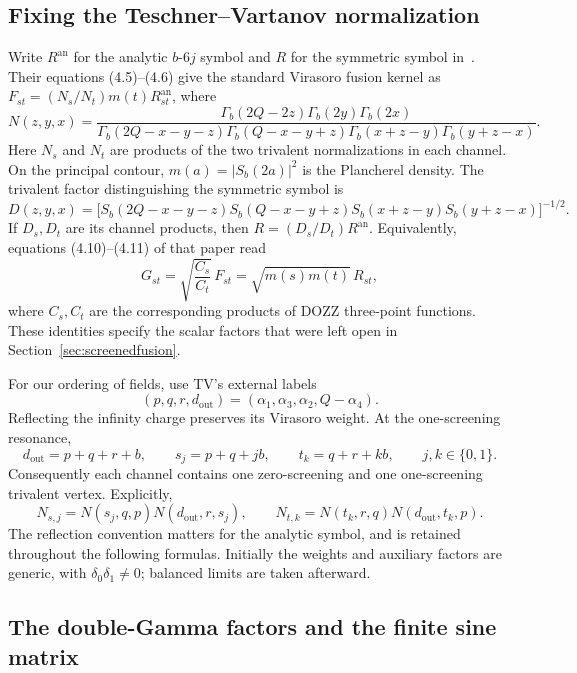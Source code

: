 \documentclass[11pt,a4paper]{article}
\numberwithin{equation}{section}
\theoremstyle{definition}
\theoremstyle{remark}
\begin{document}
\subsection{Fixing the Teschner--Vartanov normalization}

Write $R^{\mathrm{an}}$ for the analytic $b$-$6j$ symbol and
$R$ for the symmetric symbol in~\cite{TeschnerVartanov}.
Their equations (4.5)--(4.6) give the standard Virasoro fusion
kernel as $F_{st}=(N_s/N_t)m(t)R^{\mathrm{an}}_{st}$, where
\begin{equation}
 N(z,y,x)=
 \frac{\Gamma_b(2Q-2z)\Gamma_b(2y)\Gamma_b(2x)}
 {\Gamma_b(2Q-x-y-z)\Gamma_b(Q-x-y+z)
  \Gamma_b(x+z-y)\Gamma_b(y+z-x)}.
 \label{eq:TVnormalization}
\end{equation}
Here $N_s$ and $N_t$ are products of the two trivalent
normalizations in each channel. On the principal contour,
$m(a)=|S_b(2a)|^2$ is the Plancherel density. The trivalent
factor distinguishing the symmetric symbol is
\[
 D(z,y,x)=
 \bigl[S_b(2Q-x-y-z)S_b(Q-x-y+z)
 S_b(x+z-y)S_b(y+z-x)\bigr]^{-1/2}.
\]
If $D_s,D_t$ are its channel products, then
$R=(D_s/D_t)R^{\mathrm{an}}$. Equivalently, equations
(4.10)--(4.11) of that paper read
\begin{equation}
 G_{st}=\sqrt{\frac{C_s}{C_t}}\,F_{st}
       =\sqrt{m(s)m(t)}\,R_{st},
 \label{eq:TVunitarykernel}
\end{equation}
where $C_s,C_t$ are the corresponding products of DOZZ
three-point functions. These identities specify the scalar
factors that were left open in Section~\ref{sec:screenedfusion}.

For our ordering of fields, use TV's external labels
\begin{equation}
 (p,q,r,d_{\mathrm{out}})
   =(\alpha_1,\alpha_3,\alpha_2,Q-\alpha_4).
 \label{eq:TVreflectedlabels}
\end{equation}
Reflecting the infinity charge preserves its Virasoro weight.
At the one-screening resonance,
\[
 d_{\mathrm{out}}=p+q+r+b,\qquad
 s_j=p+q+jb,\qquad t_k=q+r+kb,\qquad j,k\in\{0,1\}.
\]
Consequently each channel contains one zero-screening and one
one-screening trivalent vertex. Explicitly,
\[
 N_{s,j}=N(s_j,q,p)N(d_{\mathrm{out}},r,s_j),\qquad
 N_{t,k}=N(t_k,r,q)N(d_{\mathrm{out}},t_k,p).
\]
The reflection convention matters for the analytic symbol,
and is retained throughout the following formulas. Initially
the weights and auxiliary factors are generic, with
$\delta_0\delta_1\ne0$; balanced limits are taken afterward.

\subsection{The double-Gamma factors and the finite sine matrix}
\end{document}
